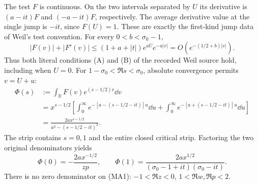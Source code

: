 \documentclass[11pt]{article}
\newcommand{\R}{\mathbb R}\newcommand{\C}{\mathbb C}
\begin{document}
The test $F$ is continuous. On the two intervals separated by $U$ its
derivative is $(a-it)F$ and $(-a-it)F$, respectively. The average derivative
value at the single jump is $-it$, since $F(U)=1$. These are exactly the
first-kind jump data of Weil's test convention. For every
$0<b<\sigma_0-1$,
\[
 |F(v)|+|F'(v)|\le(1+a+|t|)e^{aU}e^{-a|v|}
 =O(e^{-(1/2+b)|v|}).
\]
Thus both literal conditions (A) and (B) of the recorded Weil source hold,
including when $U=0$.
For $1-\sigma_0<\Re s<\sigma_0$, absolute convergence permits $v=U+u$:
\begin{equation}\tag{MA3}\begin{aligned}
 \Phi(s)&:=\int_\R F(v)e^{(s-1/2)v}\dd v\\
 &=x^{s-1/2}\left[
 \int_0^\infty e^{-[a-(s-1/2-it)]u}\dd u
 +\int_0^\infty e^{-[a+(s-1/2-it)]u}\dd u\right]\\
 &=\frac{2a x^{s-1/2}}{a^2-(s-1/2-it)^2}.
\end{aligned}\end{equation}
The strip contains $s=0,1$ and the entire closed critical strip. Factoring
the two original denominators yields
\begin{equation}\tag{MA4}
 \Phi(0)=-\frac{2a x^{-1/2}}{zp},\qquad
 \Phi(1)=\frac{2a x^{1/2}}{(\sigma_0-1+it)(\sigma_0-it)}.
\end{equation}
There is no zero denominator on (MA1): $-1<\Re z<0$, $1<\Re w,\Re p<2$.
\end{document}

